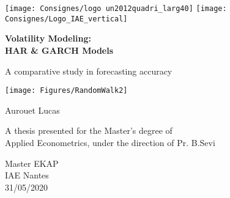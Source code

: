 \begin{titlepage}
\flushleft
\texttt{[image: Consignes/logo un2012quadri\_larg40]}
\hfill
\texttt{[image: Consignes/Logo\_IAE\_vertical]}

   \begin{center}
       \vspace*{1cm}

			 \Large
       \textbf{Volatility Modeling: \\ HAR \& GARCH Models}

       \vspace{0.4cm}
			 \large
       A comparative study in forecasting accuracy

       \vfill
			
			 \texttt{[image: Figures/RandomWalk2]}
			
			 \vspace{0.7cm}

			 \normalsize
       Aurouet Lucas
			
			\vspace{0.5cm}
        
			 \normalsize
       A thesis presented for the Master's degree of\\
       Applied Econometrics, under the direction of Pr. B.Sevi
            
       \vspace{0.7cm}
       
       \normalsize   
       Master EKAP\\
       IAE Nantes\\
       31/05/2020
            
   \end{center}
\end{titlepage}